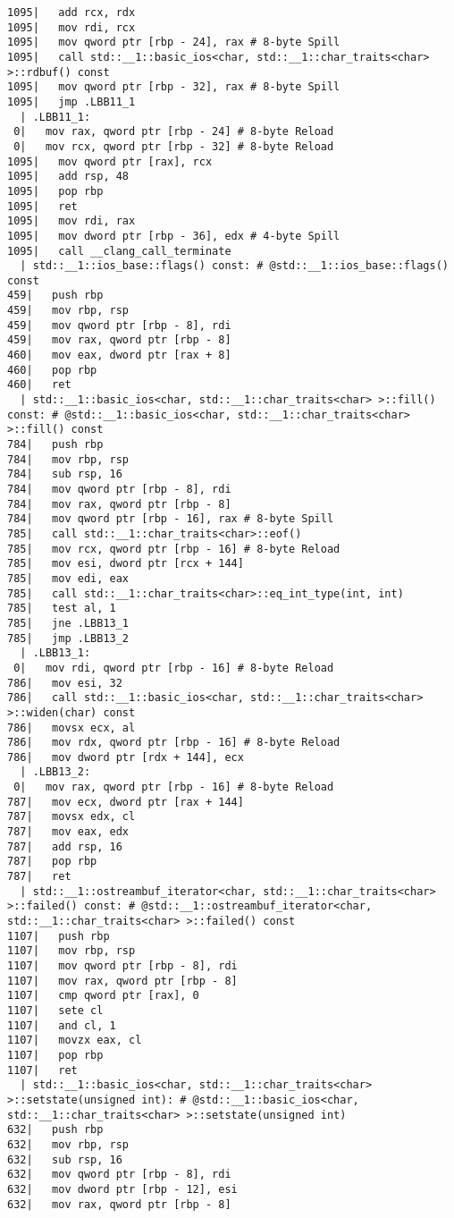 \begin{lstlisting}[language={},numbers=none,title=\href{https://godbolt.org/z/hwKje8}{\texttt{godbolt.org/z/hwKje8}}]
1095|   add rcx, rdx
1095|   mov rdi, rcx
1095|   mov qword ptr [rbp - 24], rax # 8-byte Spill
1095|   call std::__1::basic_ios<char, std::__1::char_traits<char> >::rdbuf() const
1095|   mov qword ptr [rbp - 32], rax # 8-byte Spill
1095|   jmp .LBB11_1
  | .LBB11_1:
 0|   mov rax, qword ptr [rbp - 24] # 8-byte Reload
 0|   mov rcx, qword ptr [rbp - 32] # 8-byte Reload
1095|   mov qword ptr [rax], rcx
1095|   add rsp, 48
1095|   pop rbp
1095|   ret
1095|   mov rdi, rax
1095|   mov dword ptr [rbp - 36], edx # 4-byte Spill
1095|   call __clang_call_terminate
  | std::__1::ios_base::flags() const: # @std::__1::ios_base::flags() const
459|   push rbp
459|   mov rbp, rsp
459|   mov qword ptr [rbp - 8], rdi
459|   mov rax, qword ptr [rbp - 8]
460|   mov eax, dword ptr [rax + 8]
460|   pop rbp
460|   ret
  | std::__1::basic_ios<char, std::__1::char_traits<char> >::fill() const: # @std::__1::basic_ios<char, std::__1::char_traits<char> >::fill() const
784|   push rbp
784|   mov rbp, rsp
784|   sub rsp, 16
784|   mov qword ptr [rbp - 8], rdi
784|   mov rax, qword ptr [rbp - 8]
784|   mov qword ptr [rbp - 16], rax # 8-byte Spill
785|   call std::__1::char_traits<char>::eof()
785|   mov rcx, qword ptr [rbp - 16] # 8-byte Reload
785|   mov esi, dword ptr [rcx + 144]
785|   mov edi, eax
785|   call std::__1::char_traits<char>::eq_int_type(int, int)
785|   test al, 1
785|   jne .LBB13_1
785|   jmp .LBB13_2
  | .LBB13_1:
 0|   mov rdi, qword ptr [rbp - 16] # 8-byte Reload
786|   mov esi, 32
786|   call std::__1::basic_ios<char, std::__1::char_traits<char> >::widen(char) const
786|   movsx ecx, al
786|   mov rdx, qword ptr [rbp - 16] # 8-byte Reload
786|   mov dword ptr [rdx + 144], ecx
  | .LBB13_2:
 0|   mov rax, qword ptr [rbp - 16] # 8-byte Reload
787|   mov ecx, dword ptr [rax + 144]
787|   movsx edx, cl
787|   mov eax, edx
787|   add rsp, 16
787|   pop rbp
787|   ret
  | std::__1::ostreambuf_iterator<char, std::__1::char_traits<char> >::failed() const: # @std::__1::ostreambuf_iterator<char, std::__1::char_traits<char> >::failed() const
1107|   push rbp
1107|   mov rbp, rsp
1107|   mov qword ptr [rbp - 8], rdi
1107|   mov rax, qword ptr [rbp - 8]
1107|   cmp qword ptr [rax], 0
1107|   sete cl
1107|   and cl, 1
1107|   movzx eax, cl
1107|   pop rbp
1107|   ret
  | std::__1::basic_ios<char, std::__1::char_traits<char> >::setstate(unsigned int): # @std::__1::basic_ios<char, std::__1::char_traits<char> >::setstate(unsigned int)
632|   push rbp
632|   mov rbp, rsp
632|   sub rsp, 16
632|   mov qword ptr [rbp - 8], rdi
632|   mov dword ptr [rbp - 12], esi
632|   mov rax, qword ptr [rbp - 8]

\end{lstlisting}
